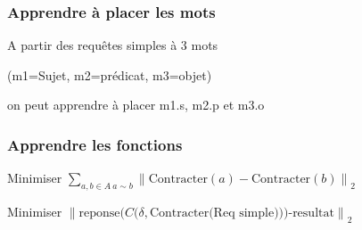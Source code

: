 \documentclass{beamer}
\newcommand{\N}[1]{\left\|#1\right\|_2}
\begin{document}
\begin{frame}
\frametitle{Apprendre à placer les mots}
A partir des requêtes simples à 3 mots 

(m1=Sujet, m2=prédicat, m3=objet)

 on peut apprendre à placer m1.s, m2.p et m3.o
\end{frame}


\begin{frame}
\frametitle{Apprendre les fonctions}
Minimiser $\sum_{a,b\in A \ a\sim b} \N{\text{Contracter}(a)-\text{Contracter}(b)}$

Minimiser $\N{\text{reponse}(C(\delta,\text{Contracter(Req simple)))-resultat}}$
\end{frame}
\end{document}
